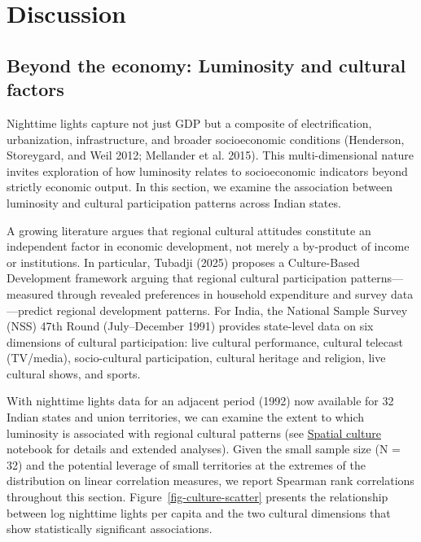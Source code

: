 \documentclass[
  letterpaper,
  DIV=11,
  numbers=noendperiod]{scrartcl}
\begin{document}
\section{Discussion}\label{discussion}

\subsection{Beyond the economy: Luminosity and cultural
factors}\label{beyond-the-economy-luminosity-and-cultural-factors}

Nighttime lights capture not just GDP but a composite of
electrification, urbanization, infrastructure, and broader socioeconomic
conditions (Henderson, Storeygard, and Weil 2012; Mellander et al.
2015). This multi-dimensional nature invites exploration of how
luminosity relates to socioeconomic indicators beyond strictly economic
output. In this section, we examine the association between luminosity
and cultural participation patterns across Indian states.

A growing literature argues that regional cultural attitudes constitute
an independent factor in economic development, not merely a by-product
of income or institutions. In particular, Tubadji (2025) proposes a
Culture-Based Development framework arguing that regional cultural
participation patterns---measured through revealed preferences in
household expenditure and survey data---predict regional development
patterns. For India, the National Sample Survey (NSS) 47th Round
(July--December 1991) provides state-level data on six dimensions of
cultural participation: live cultural performance, cultural telecast
(TV/media), socio-cultural participation, cultural heritage and
religion, live cultural shows, and sports.

With nighttime lights data for an adjacent period (1992) now available
for 32 Indian states and union territories, we can examine the extent to
which luminosity is associated with regional cultural patterns (see
\href{https://quarcs-lab.github.io/project2025s/notebooks/c06_spatial_culture.html}{Spatial
culture} notebook for details and extended analyses). Given the small
sample size (N = 32) and the potential leverage of small territories at
the extremes of the distribution on linear correlation measures, we
report Spearman rank correlations throughout this section.
Figure~\ref{fig-culture-scatter} presents the relationship between log
nighttime lights per capita and the two cultural dimensions that show
statistically significant associations.
\end{document}
